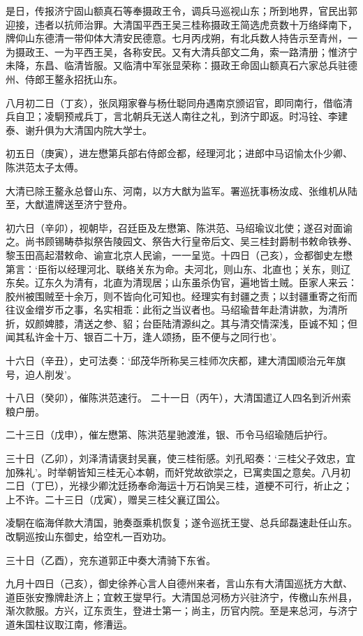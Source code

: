 \documentclass[]{article}
\begin{document}
是日，传报济宁固山额真石等奉摄政王令，调兵马巡视山东；所到地界，官民出郭迎接，违者以抗师治罪。大清国平西王吴三桂称摄政王简选虎贲数十万络绎南下，牌仰山东德清一带仰体大清安民德意。七月丙戌朔，有北兵数人持告示至青州，一为摄政王、一为平西王吴，各称安民。又有大清兵部文二角，索一路清册；惟济宁未降，东昌、临清皆服。又临清中军张显荣称：摄政王命固山额真石六家总兵驻德州、侍郎王鳌永招抚山东。

八月初二日（丁亥），张凤翔家眷与杨仕聪同舟遇南京颁诏官，即同南行，借临清兵自卫；凌駉预戒兵丁，言北朝兵无送人南往之礼，到济宁即返。时冯铨、李建泰、谢升俱为大清国内院大学士。

初五日（庚寅），进左懋第兵部右侍郎佥都，经理河北；进郎中马诏愉太仆少卿、陈洪范太子太傅。

大清已除王鳌永总督山东、河南，以方大猷为监军。署巡抚事杨汝成、张维机从陆至，大猷遣牌送至济宁登舟。

初六日（辛卯），视朝毕，召廷臣及左懋第、陈洪范、马绍瑜议北使；遂召对面谕之。尚书顾锡畴恭拟祭告陵园文、祭告大行皇帝后文、吴三桂封爵制书敕命铁券、黎玉田高起潜敕命、谕宣北京人民谕，一一呈览。十四日（己亥），佥都御史左懋第言：`臣衔以经理河北、联络关东为命。夫河北，则山东、北直也；关东，则辽东矣。辽东久为清有，北直为清现居；山东虽杀伪官，遍地皆土贼。臣家人来云：胶州被围贼至十余万，则不皆向化可知也。经理实有封疆之责；以封疆重寄之衔而往议金缯岁币之事，名实相乖：此衔之当议者也。马绍瑜昔年赴清讲款，为清所折，奴颜婢膝，清送之参、貂；台臣陆清源纠之。其与清交情深浅，臣诚不知；但闻其私许金十万、银百二十万，逢人颂扬，臣不便与之同行也'。

十六日（辛丑），史可法奏：`邱茂华所称吴三桂师次庆都，建大清国顺治元年旗号，迫人削发'。

十八日（癸卯），催陈洪范速行。
二十一日（丙午），大清国遣辽人四名到沂州索粮户册。

二十三日（戊申），催左懋第、陈洪范星驰渡淮，银、币令马绍瑜随后护行。

三十日（乙卯），刘泽清请褒封吴襄，使三桂衔感。刘孔昭奏：`三桂父子效忠，宜加殊礼'。时举朝皆知三桂无心本朝，而奸党故欲崇之，已寓卖国之意矣。八月初二日（丁巳），光禄少卿沈廷扬奉命海运十万石饷吴三桂，道梗不可行，祈止之；上不许。二十三日（戊寅），赠吴三桂父襄辽国公。

凌駉在临海佯款大清国，驰奏亟乘机恢复；遂令巡抚王燮、总兵邱磊速赴任山东。改駉巡按山东御史，给空札一百劝功。

三十日（乙酉），兖东道郭正中奏大清骑下东省。

九月十四日（己亥），御史徐养心言人自德州来者，言山东有大清国巡抚方大猷、道臣张安豫牌赴济上；宜敕王燮早行。大清国总河杨方兴驻济宁，传檄山东州县，渐次款服。方兴，辽东贡生，登进士第一；尚主，历官内院。至是来总河，与济宁道朱国柱议取江南，修漕运。
\end{document}
